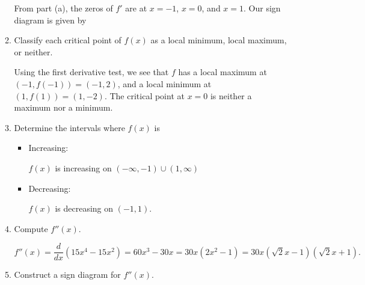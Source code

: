 \documentclass[12pt]{article}
\newcommand{\points}[1]{\marginpar{\hspace{24pt}[#1]}}
\begin{document}
\begin{enumerate}
\begin{enumerate}
\medskip

From part (a), the zeros of $f'$ are at $x=-1$, $x=0$, and $x=1$. Our sign diagram is given by
\begin{center}
\end{center}

\bigskip

 \item Classify each critical point of $f(x)$ \points{1} as a local minimum, local maximum, or neither.

\bigskip

Using the first derivative test, we see that $f$ has a local maximum at $(-1,f(-1))=(-1,2)$, and a local minimum at $(1,f(1)) = (1,-2)$. The critical point at $x=0$ is neither a maximum nor a minimum.

\bigskip

 \item Determine the intervals where $f(x)$ is\points{2}
\begin{itemize}
 \item Increasing:

\medskip

$f(x)$ is increasing on $(-\infty,-1)\cup (1,\infty)$

\medskip


 \item Decreasing:

\medskip

$f(x)$ is decreasing on $(-1,1)$.

\medskip

\end{itemize}

 \item Compute $f''(x)$.\points{1}

\medskip

\[
 f''(x) = \frac{d}{dx}(15x^4-15x^2)=60x^3-30x=30x(2x^2-1)=30x(\sqrt{2}x-1)(\sqrt{2}x+1).
\]

\medskip

 \item Construct a sign diagram for $f''(x)$. \points{1}


\end{enumerate}
\end{enumerate}
\end{document}
